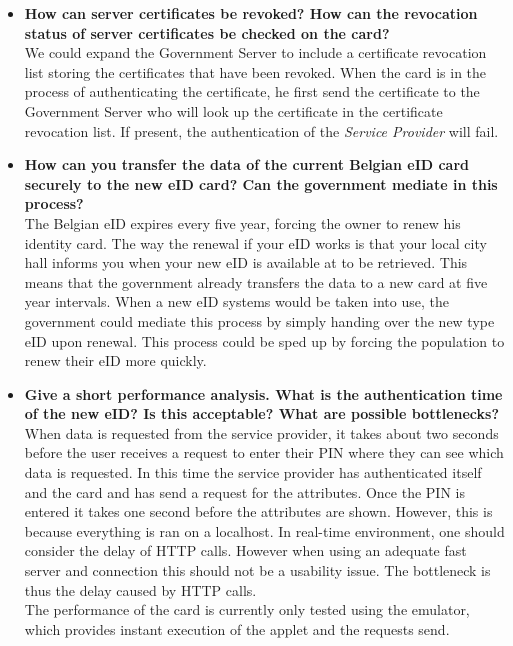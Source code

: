\documentclass[12pt]{report}
\begin{document}
\begin{itemize}
\item \textbf{How can server certificates be revoked? How can the revocation status of server certificates be checked on the card?}\\
We could expand the Government Server to include a certificate revocation list storing the certificates that have been revoked. When the card is in the process of authenticating the certificate, he first send the certificate to the Government Server who will look up the certificate in the certificate revocation list. If present, the authentication of the \textit{Service Provider} will fail.

\item \textbf{How can you transfer the data of the current Belgian eID card securely to the new eID card? Can the government mediate in this process?}\\
The Belgian eID expires every five year, forcing the owner to renew his identity card. The way the renewal if your eID works is that your local city hall informs you when your new eID is available at to be retrieved. This means that the government already transfers the data to a new card at five year intervals. When a new eID systems would be taken into use, the government could mediate this process by simply handing over the new type eID upon renewal. This process could be sped up by forcing the population to renew their eID more quickly.

\item \textbf{Give a short performance analysis. What is the authentication time of the new eID? Is this acceptable? What are possible bottlenecks?}\\
When data is requested from the service provider, it takes about two seconds before the user receives a request to enter their PIN where they can see which data is requested. In this time the service provider has authenticated itself and the card and has send a request for the attributes. Once the PIN is entered it takes one second before the attributes are shown. However, this is because everything is ran on a localhost. In real-time environment, one should consider the delay of HTTP calls. However when using an adequate fast server and connection this should not be a usability issue. The bottleneck is thus the delay caused by HTTP calls.\\
The performance of the card is currently only tested using the emulator, which provides instant execution of the applet and the requests send. 


\end{itemize}
\end{document}
